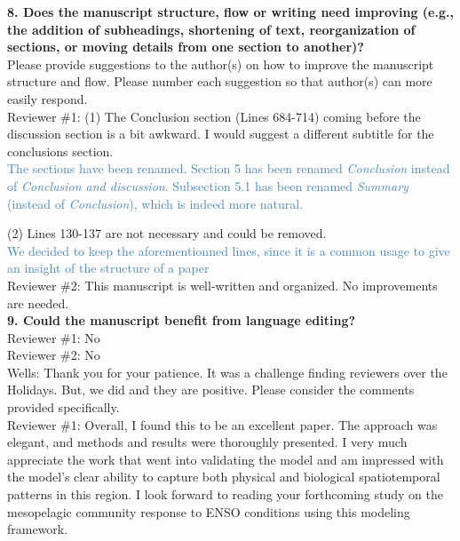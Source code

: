\documentclass[12pt]{article}
\newcommand{\resp}[1]{\textcolor{SteelBlue}{#1}}
\begin{document}
\textbf{8. Does the manuscript structure, flow or writing need improving (e.g., the addition of subheadings, shortening of text, reorganization of sections, or moving details from one section to another)?}\\

Please provide suggestions to the author(s) on how to improve the manuscript structure and flow. Please number each suggestion so that author(s) can more easily respond.\\

Reviewer \#1: (1) The Conclusion section (Lines 684-714) coming before the discussion section is a bit awkward. I would suggest a different subtitle for the conclusions section.\\

\resp{The sections have been renamed. Section 5 has been renamed \emph{Conclusion} instead of \emph{Conclusion and discussion}. Subsection 5.1 has been renamed \emph{Summary} (instead of \emph{Conclusion}), which is indeed more natural.}

(2) Lines 130-137 are not necessary and could be removed.\\

\resp{We decided to keep the aforementionned lines, since it is a common usage to give an insight of the structure of a paper} \\

Reviewer \#2: This manuscript is well-written and organized. No improvements are needed.\\

\textbf{9. Could the manuscript benefit from language editing?}\\

Reviewer \#1: No\\

Reviewer \#2: No\\

Wells: Thank you for your patience. It was a challenge finding reviewers over the Holidays. But, we did and they are positive. Please consider the comments provided specifically.\\

Reviewer \#1: Overall, I found this to be an excellent paper. The approach was elegant, and methods and results were thoroughly presented. I very much appreciate the work that went into validating the model and am impressed with the model's clear ability to capture both physical and biological spatiotemporal patterns in this region. I look forward to reading your forthcoming study on the mesopelagic community response to ENSO conditions using this modeling framework.\\
\end{document}
